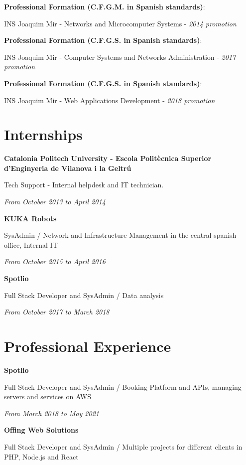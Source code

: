 \documentclass{article}
\newcommand\tab[1][0.5cm]{\hspace*{#1}}
\newcommand{\nl}{\vspace{3mm}}
\begin{document}
{	\textbf{Professional Formation (C.F.G.M. in Spanish standards)}:
	
	\tab INS Joaquim Mir - Networks and Microcomputer Systems - \textit{2014 promotion}
	
	\nl
	\textbf{Professional Formation (C.F.G.S. in Spanish standards)}:
	
	\tab INS Joaquim Mir - Computer Systems and Networks Administration - \textit{2017 promotion}
	
	\nl
	\textbf{Professional Formation (C.F.G.S. in Spanish standards)}:
	
	\tab INS Joaquim Mir - Web Applications Development - \textit{2018 promotion}
	
	\section*{Internships}
	
	\textbf{Catalonia Politech University - Escola Politècnica Superior d'Enginyeria de Vilanova i la Geltrú}
	
	\tab Tech Support - Internal helpdesk and IT technician.
	
	\tab \textit{From October 2013 to April 2014}
	
	\nl
	\textbf{KUKA Robots}
	
	\tab SysAdmin / Network and Infrastructure Management in the central spanish office, Internal IT
	
	\tab \textit{From October 2015 to April 2016}

	\nl
	\textbf{Spotlio}
	
	\tab Full Stack Developer and SysAdmin / Data analysis
	
	\tab \textit{From October 2017 to March 2018}

	\section*{Professional Experience}

	\nl
	\textbf{Spotlio}
	
	\tab Full Stack Developer and SysAdmin / Booking Platform and APIs, managing servers and services on AWS
	
	\tab \textit{From March 2018 to May 2021}
	
	\nl
	\textbf{Offing Web Solutions}
	
	\tab Full Stack Developer and SysAdmin / Multiple projects for different clients in PHP, Node.js and React
	
}
\end{document}
